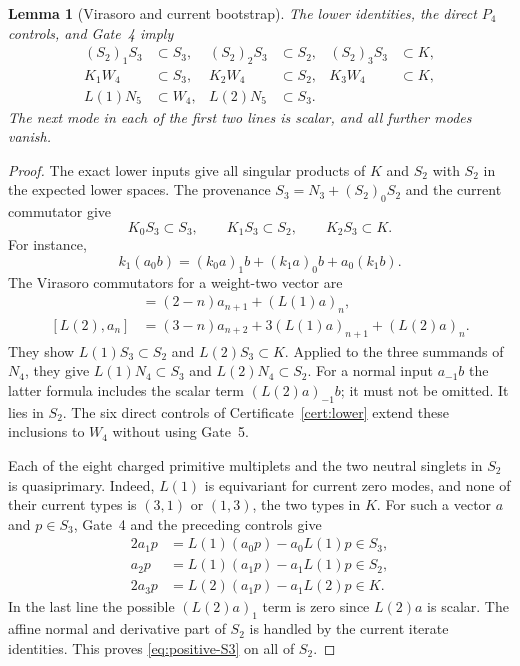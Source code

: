 \documentclass[11pt,a4paper]{article}
\newtheorem{lemma}[theorem]{Lemma}
\theoremstyle{definition}
\begin{document}
\begin{lemma}[Virasoro and current bootstrap]\label{lem:bootstrap}
The lower identities, the direct $P_4$ controls, and Gate~4 imply
\begin{align}
 (S_2)_1S_3&\subset S_3,& (S_2)_2S_3&\subset S_2,&
 (S_2)_3S_3&\subset K,\label{eq:positive-S3}\\
 K_1W_4&\subset S_3,&K_2W_4&\subset S_2,&K_3W_4&\subset K,
 \label{eq:positive-W4}\\
 L(1)N_5&\subset W_4,&L(2)N_5&\subset S_3.&&
 \label{eq:positive-N5}
\end{align}
The next mode in each of the first two lines is scalar, and all further
modes vanish.
\end{lemma}
\begin{proof}
The exact lower inputs give all singular products of $K$ and $S_2$
with $S_2$ in the expected lower spaces. The provenance
$S_3=N_3+(S_2)_0S_2$ and the current commutator give
\[
 K_0S_3\subset S_3,\qquad K_1S_3\subset S_2,\qquad
 K_2S_3\subset K.
\]
For instance,
\begin{equation}\label{eq:k1-provenance}
 k_1(a_0b)=(k_0a)_1b+(k_1a)_0b+a_0(k_1b).
\end{equation}
The Virasoro commutators for a weight-two vector are
\begin{align}
 [L(1),a_n]&=(2-n)a_{n+1}+(L(1)a)_n,\label{eq:L1-weight2}\\
 [L(2),a_n]&=(3-n)a_{n+2}+3(L(1)a)_{n+1}+(L(2)a)_n.
 \label{eq:L2-weight2}
\end{align}
They show $L(1)S_3\subset S_2$ and $L(2)S_3\subset K$.
Applied to the three summands of $N_4$, they give
$L(1)N_4\subset S_3$ and $L(2)N_4\subset S_2$.
For a normal input $a_{-1}b$ the latter formula includes the scalar
term $(L(2)a)_{-1}b$; it must not be omitted. It lies in $S_2$.
The six direct controls of Certificate~\ref{cert:lower} extend these
inclusions to $W_4$ without using Gate~5.

Each of the eight charged primitive multiplets and the two neutral
singlets in $S_2$ is quasiprimary. Indeed, $L(1)$ is equivariant for
current zero modes, and none of their current types is $(3,1)$ or
$(1,3)$, the two types in $K$. For such a vector $a$ and $p\in S_3$,
Gate~4 and the preceding controls give
\begin{align*}
 2a_1p&=L(1)(a_0p)-a_0L(1)p\in S_3,\\
 a_2p&=L(1)(a_1p)-a_1L(1)p\in S_2,\\
 2a_3p&=L(2)(a_1p)-a_1L(2)p\in K.
\end{align*}
In the last line the possible $(L(2)a)_1$ term is zero since $L(2)a$
is scalar. The affine normal and derivative part of $S_2$ is handled
by the current iterate identities. This proves
\eqref{eq:positive-S3} on all of $S_2$.


\end{proof}
\end{document}
